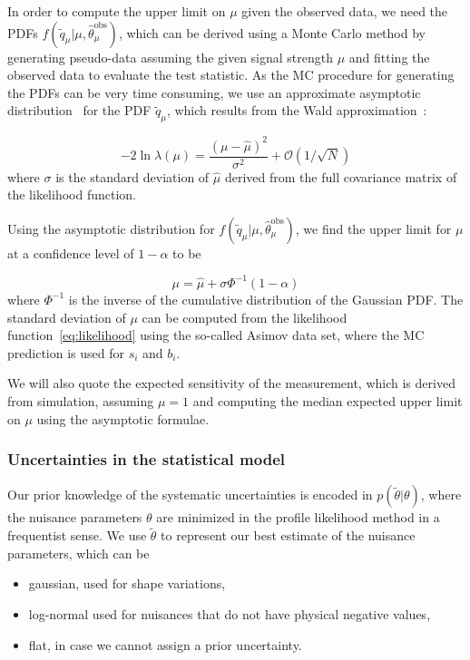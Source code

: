 In order to compute the upper limit on $\mu$ given the observed data, we need the PDFs $f(\tilde{q}_\mu | \mu, \hat{\theta}_\mu^{\mathrm{obs}})$, which can be derived using a Monte Carlo method by generating pseudo-data assuming the given signal strength $\mu$ and fitting the observed data to evaluate the test statistic. As the MC procedure for generating the PDFs can be very time consuming, we use an approximate asymptotic distribution~\cite{Cowan:2010js} for the PDF $\tilde{q}_\mu$, which results from the Wald approximation~\cite{wald1943tests}:

\begin{equation}
-2 \ln{\lambda(\mu)} = \frac{(\mu - \hat{\mu})^2}{\sigma^2}+ \mathcal{O}(1/\sqrt{N})
\end{equation}
where $\sigma$ is the standard deviation of $\hat{\mu}$ derived from the full covariance matrix of the likelihood function.

Using the asymptotic distribution for $f(\tilde{q}_\mu | \mu, \hat{\theta}_\mu^{\mathrm{obs}})$, we find the upper limit for $\mu$ at a confidence level of $1 - \alpha$ to be

\begin{equation}
\mu = \hat{\mu} + \sigma \Phi^{-1}(1 - \alpha)
\end{equation}
where $\Phi^{-1}$ is the inverse of the cumulative distribution of the Gaussian PDF. The standard deviation of $\mu$ can be computed from the likelihood function~\cref{eq:likelihood} using the so-called Asimov data set, where the MC prediction is used for $s_i$ and $b_i$.

We will also quote the expected sensitivity of the measurement, which is derived from simulation, assuming $\mu = 1$ and computing the median expected upper limit on $\mu$ using the asymptotic formulae. 

\subsubsection{Uncertainties in the statistical model}

Our prior knowledge of the systematic uncertainties is encoded in $p(\tilde{\theta} | \theta)$, where the nuisance parameters $\theta$ are minimized in the profile likelihood method in a frequentist sense. We use $\tilde{\theta}$ to represent our best estimate of the nuisance parameters, which can be
\begin{itemize}
\item gaussian, used for shape variations,
\item log-normal used for nuisances that do not have physical negative values,
\item flat, in case we cannot assign a prior uncertainty.
\end{itemize}

